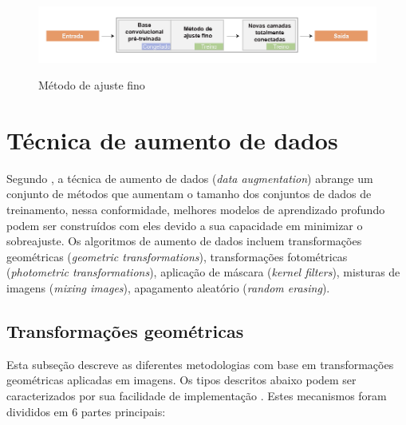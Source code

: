 \documentclass[
	12pt,				%
	oneside,			%
	a4paper,			%
	english,			%
	brazil				%
	]{abntex2ppgsi}
\begin{document}
\begin{figure}[H]
    \centering
    \caption{Método de ajuste fino}
    \includegraphics[scale=.50]{imagens/conceitos_basicos/fine_tuning_method.jpg}
    \label{fig:fine_tuning_method}
\end{figure}

\section{Técnica de aumento de dados}
Segundo , a técnica de aumento de dados (\textit{data augmentation}) abrange um conjunto de métodos que aumentam o tamanho dos conjuntos de dados de treinamento, nessa conformidade, melhores modelos de aprendizado profundo podem ser construídos com eles devido a sua capacidade em minimizar o sobreajuste. Os algoritmos de aumento de dados incluem transformações geométricas (\textit{geometric transformations}), transformações fotométricas (\textit{photometric transformations}), aplicação de máscara (\textit{kernel filters}), misturas de imagens (\textit{mixing images}), apagamento aleatório (\textit{random erasing}).

\subsection{Transformações geométricas}
Esta subseção descreve as diferentes metodologias com base em transformações geométricas aplicadas em imagens. Os tipos descritos abaixo podem ser caracterizados por sua facilidade de implementação \cite{shorten2019survey}. Estes mecanismos foram divididos em 6 partes principais:
\end{document}
